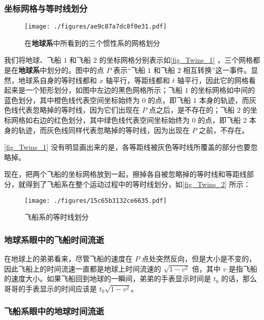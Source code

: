 \subsubsection{坐标网格与等时线划分}

\begin{figure}[ht]
\centering
\texttt{[image: ./figures/ae9c87a7dc8f0e31.pdf]}
\caption{在\textbf{地球系}中所看到的三个惯性系的网格划分} \label{fig_Twins_1}
\end{figure}

我们将地球、飞船 $1$ 和飞船 $2$ 的坐标网格分别表示如\autoref{fig_Twins_1} ，三个网格都是在\textbf{地球系}中划分的。图中的点 $P$ 表示“飞船 $1$ 和飞船 $2$ 相互转换”这一事件。显然，地球系自身的等时线都和 $x$ 轴平行，等距线都和 $t$ 轴平行，因此它的网格看起来是一个矩形划分，如图中左边的黑色网格所示；飞船 $1$ 的坐标网格如中间的蓝色划分，其中橙色线代表空间坐标始终为 $0$ 的点，即飞船 $1$ 本身的轨迹，而灰色线代表忽略掉的等时线，因为它们出现在 $P$ 点之后，是不存在的；飞船 $2$ 的坐标网格如右边的红色划分，其中绿色线代表空间坐标始终为 $0$ 的点，即飞船 $2$ 本身的轨迹，而灰色线同样代表忽略掉的等时线，因为出现在 $P$ 之前，不存在。

\autoref{fig_Twins_1} 没有明显画出来的是，各等距线被灰色等时线所覆盖的部分也要忽略掉。

现在，把两个飞船的坐标网格放到一起，擦掉各自被忽略掉的等时线和等距线部分，就得到了飞船系在整个运动过程中的等时线划分，如\autoref{fig_Twins_2} 所示：

\begin{figure}[ht]
\centering
\texttt{[image: ./figures/15c65b3132ce6635.pdf]}
\caption{飞船系的等时线划分} \label{fig_Twins_2}
\end{figure}

\subsubsection{地球系眼中的飞船时间流逝}

在地球上的弟弟看来，尽管飞船的速度在 $P$ 点处突然反向，但是大小是不变的，因此飞船上的时间流速一直都是地球上时间流速的 $\sqrt{1-v^2}$ 倍，其中 $v$ 是指飞船的速度大小。如果飞船回到地球的一瞬间，弟弟的手表显示时间是 $t_0$ 的话，那么哥哥的手表显示的时间应该是 $t_0\sqrt{1-v^2}$。

\subsubsection{飞船系眼中的地球时间流逝}

